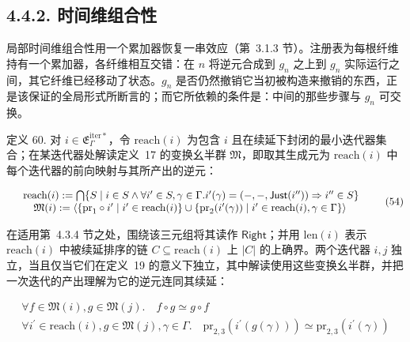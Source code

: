 \subsection{4.4.2. 时间维组合性}\label{temporal-composability}

局部时间维组合性用一个累加器恢复一串效应（第~3.1.3 节）。注册表为每根纤维持有一个累加器，各纤维相互交错：在 \(n\) 将逆元合成到 \(g _ { n }\) 之上到 \(g _ { n }\) 实际运行之间，其它纤维已经移动了状态。\(g _ { n }\) 是否仍然撤销它当初被构造来撤销的东西，正是该保证的全局形式所断言的；而它所依赖的条件是：中间的那些步骤与 \(g _ { n }\) 可交换。

定义 60. 对 \(i \in { \mathfrak { E } } _ { \Gamma } ^ { \mathrm { i t e r * } }\)，令 \(\mathrm { r e a c h } ( i )\) 为包含 \(i\) 且在续延下封闭的最小迭代器集合；在某迭代器处解读定义~17 的变换幺半群 \(\mathfrak { M }\)，即取其生成元为 \(\mathrm { r e a c h } ( i )\) 中每个迭代器的前向映射与其所产出的逆元：

\[
\begin{array} { r l } & { \mathrm { r e a c h } ( i ) : = \bigcap \{ S \mid i \in S \land \forall i ^ { \prime } \in S , \gamma \in \Gamma . i ^ { \prime } ( \gamma ) = ( - , - , \mathsf { J u s t } ( i ^ { \prime \prime } ) ) \Rightarrow i ^ { \prime \prime } \in S \} } \\ & { \quad \mathfrak { M } ( i ) : = \langle \{ \mathrm { p r } _ { 1 } \circ i ^ { \prime } \mid i ^ { \prime } \in \mathrm { r e a c h } ( i ) \} \cup \{ \mathrm { p r } _ { 2 } ( i ^ { \prime } ( \gamma ) ) \mid i ^ { \prime } \in \mathrm { r e a c h } ( i ) , \gamma \in \Gamma \} \rangle } \end{array}\tag{54}
\]

在适用第~4.3.4 节之处，围绕该三元组将其读作 \(\mathsf { R i g h t }\)；并用 \(\mathrm { l e n } ( i )\) 表示 \(\mathrm { r e a c h } ( i )\) 中被续延排序的链 \(C \subseteq \mathrm { r e a c h } ( i )\) 上 \(| C |\) 的上确界。两个迭代器 \(i , j\) 独立，当且仅当它们在定义~19 的意义下独立，其中解读使用这些变换幺半群，并把一次迭代的产出理解为它的逆元连同其续延：

\[
\begin{array} { r } { \forall f \in \mathfrak { M } ( i ) , g \in \mathfrak { M } ( j ) . \quad f \circ g \simeq g \circ f \qquad } \\ { \forall i ^ { \prime } \in \mathrm { r e a c h } ( i ) , g \in \mathfrak { M } ( j ) , \gamma \in \Gamma . \quad \mathrm { p r } _ { 2 , 3 } ( i ^ { \prime } ( g ( \gamma ) ) ) \simeq \mathrm { p r } _ { 2 , 3 } ( i ^ { \prime } ( \gamma ) ) } \end{array}\tag{55}
\]

